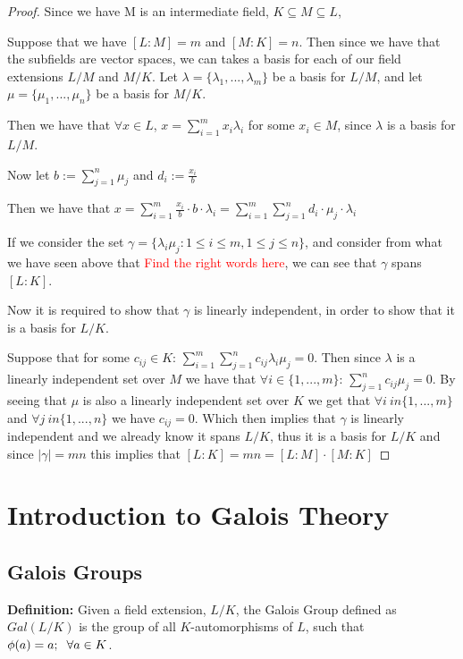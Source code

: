 \documentclass[12pt]{article}
\begin{document}
\begin{proof}
    Since we have M is an intermediate field, $K \subseteq M \subseteq L$,

    Suppose that we have $[L:M]=m$ and $[M:K]=n$. Then since we have that the
    subfields are vector spaces, we can takes a basis for each of our field
    extensions $L/M$ and $M/K$.
    Let $\lambda = \{\lambda_1,...,\lambda_m\}$ be a basis for $L/M$, and let
    $\mu
        = \{\mu_1,...,\mu_n\}$ be a basis for $M/K$.

    \noindent Then we have that $\forall x \in L$, $x =
        \sum^m_{i=1}x_i\lambda_i$
    for some $x_i \in M$, since $\lambda$ is a basis for $L/M$.

    \noindent Now let $b:=\sum^n_{j=1}\mu_j$ and $d_i:=\frac{x_i}{b}$

    \noindent Then we have that $x=\sum^m_{i=1}\frac{x_i}{b}\cdot b \cdot
        \lambda_i
        = \sum^m_{i=1}\sum^n_{j=1}d_i\cdot \mu_j \cdot \lambda_i$

    \noindent If we consider the set $\gamma=\{\lambda_i\mu_j : 1\leq i \leq m,
        1\leq j \leq n\}$, and consider from what we have seen above that
    \textcolor{red}{Find the right words here}, we can see that $\gamma$ spans
    $[L:K]$.

    Now it is required to show that $\gamma$ is linearly independent, in order
    to
    show that it is a basis for $L/K$.

    Suppose that for some $c_{ij} \in K$: $\sum^m_{i=1} \sum^n_{j=1}
        c_{ij}\lambda_i\mu_j = 0 $. Then since $\lambda$ is a linearly
    independent set
    over $M$ we have that $\forall i \in \{1,...,m\}$:\hspace{0.2cm}
    $\sum^n_{j=1}
        c_{ij}\mu_j = 0 $. By seeing that $\mu$ is also a linearly independent
    set over
    $K$ we get that $\forall i \ in \{1,...,m\}$ and $\forall j \ in
        \{1,...,n\}$
    we have $c_{ij} = 0$. Which then implies that $\gamma$ is linearly
    independent
    and we already know it spans $L/K$, thus it is a basis for $L/K$ and since
    $|\gamma|=mn$ this implies that $[L:K] = mn = [L:M]\cdot[M:K]$

\end{proof}
\section{Introduction to Galois Theory}
\subsection{Galois Groups}
\textbf{Definition:} Given a field extension, $L/K$, the Galois Group defined
as $Gal(L/K)$ is the group of all $K$-automorphisms of $L$, such that $\phi(a)
    = a ; \hspace{0.2cm} \forall a \in K$.
\end{document}
